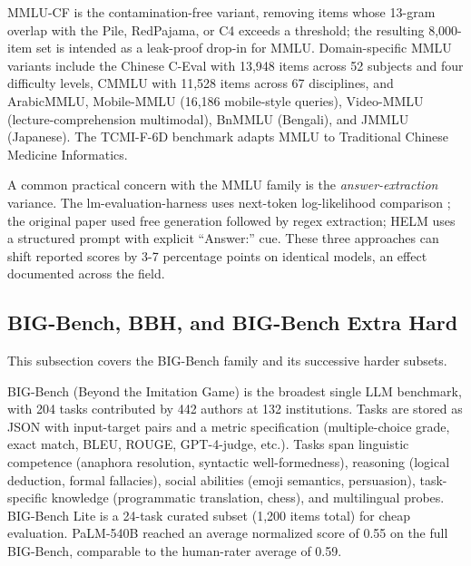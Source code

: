 \documentclass{article}
\begin{document}
MMLU-CF \cite{zhao20242024} is the contamination-free variant, removing items whose 13-gram overlap with the Pile, RedPajama, or C4 exceeds a threshold; the resulting 8,000-item set is intended as a leak-proof drop-in for MMLU. Domain-specific MMLU variants include the Chinese C-Eval \cite{huang20232023} with 13,948 items across 52 subjects and four difficulty levels, CMMLU \cite{li20242024} with 11,528 items across 67 disciplines, and ArabicMMLU, Mobile-MMLU \cite{bsharat20252025} (16,186 mobile-style queries), Video-MMLU \cite{song20252025} (lecture-comprehension multimodal), BnMMLU \cite{joy2025bnmmlumeasuringmas} (Bengali), and JMMLU (Japanese). The TCMI-F-6D benchmark \cite{teng20262026} adapts MMLU to Traditional Chinese Medicine Informatics.

A common practical concern with the MMLU family is the \emph{answer-extraction} variance. The lm-evaluation-harness uses next-token log-likelihood comparison \cite{biderman20242024}; the original paper used free generation followed by regex extraction; HELM uses a structured prompt with explicit ``Answer:'' cue. These three approaches can shift reported scores by 3-7 percentage points on identical models, an effect documented across the field.

\subsection{BIG-Bench, BBH, and BIG-Bench Extra Hard}\label{big-bench-bbh-and-big-bench-extra-hard}

This subsection covers the BIG-Bench family and its successive harder subsets.

BIG-Bench (Beyond the Imitation Game) \cite{srivastava20222022} is the broadest single LLM benchmark, with 204 tasks contributed by 442 authors at 132 institutions. Tasks are stored as JSON with input-target pairs and a metric specification (multiple-choice grade, exact match, BLEU, ROUGE, GPT-4-judge, etc.). Tasks span linguistic competence (anaphora resolution, syntactic well-formedness), reasoning (logical deduction, formal fallacies), social abilities (emoji semantics, persuasion), task-specific knowledge (programmatic translation, chess), and multilingual probes. BIG-Bench Lite is a 24-task curated subset (1,200 items total) for cheap evaluation. PaLM-540B reached an average normalized score of 0.55 on the full BIG-Bench, comparable to the human-rater average of 0.59.
\end{document}

